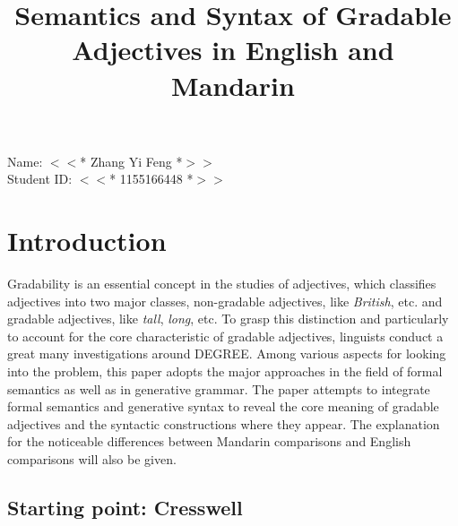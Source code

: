 \documentclass{ctexart}
\title{Semantics and Syntax of Gradable Adjectives in English and Mandarin}
\date{\vspace{-10ex}}
\begin{document}
\thispagestyle{empty} %

\begin{center}

Name: $<<$* Zhang Yi Feng *$>>$ \\
Student ID: $<<$* 1155166448 *$>>$

\end{center}

{\let\newpage\relax\maketitle}

\section{Introduction}

\setcounter{page}{1}

\noindent
Gradability is an essential concept in the studies of adjectives, which classifies adjectives into two major classes, non-gradable adjectives, like \textit{British}, etc. and gradable adjectives, like \textit{tall}, \textit{long}, etc. To grasp this distinction and particularly to account for the core characteristic of gradable adjectives, linguists conduct a great many investigations around DEGREE. Among various aspects for looking into the problem, this paper adopts the major approaches in the field of formal semantics as well as in generative grammar. The paper attempts to integrate formal semantics and generative syntax to reveal the core meaning of gradable adjectives and the syntactic constructions where they appear. The explanation for the noticeable differences between Mandarin comparisons and English comparisons will also be given.

\subsection{Starting point: Cresswell}
\end{document}
